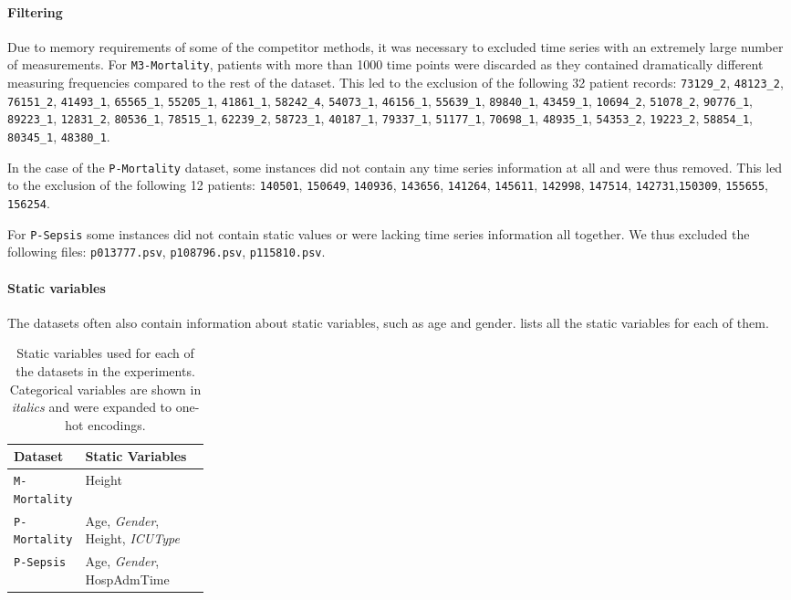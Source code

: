 \documentclass{article}
\newcommand{\dataset}[1]{\texttt{#1}}
\begin{document}
\paragraph{Filtering}
Due to memory requirements of some of the competitor methods, it was necessary
to excluded time series with an extremely large number of measurements. 
For \dataset{M3-Mortality}, patients with more than 1000 time points 
were discarded as they contained dramatically different measuring frequencies 
compared to the rest of the dataset. This led to the exclusion of the
following 32 patient records:
\texttt{73129\_2}, \texttt{48123\_2}, \texttt{76151\_2}, \texttt{41493\_1},
\texttt{65565\_1}, \texttt{55205\_1}, \texttt{41861\_1}, \texttt{58242\_4},
\texttt{54073\_1}, \texttt{46156\_1}, \texttt{55639\_1}, \texttt{89840\_1},
\texttt{43459\_1}, \texttt{10694\_2}, \texttt{51078\_2}, \texttt{90776\_1},
\texttt{89223\_1}, \texttt{12831\_2}, \texttt{80536\_1}, \texttt{78515\_1},
\texttt{62239\_2}, \texttt{58723\_1}, \texttt{40187\_1}, \texttt{79337\_1},
\texttt{51177\_1}, \texttt{70698\_1}, \texttt{48935\_1}, \texttt{54353\_2},
\texttt{19223\_2}, \texttt{58854\_1}, \texttt{80345\_1}, \texttt{48380\_1}.

In the case of the \dataset{P-Mortality} dataset, some instances did not
contain any time series information at all and were thus removed. This led to
the exclusion of the following 12 patients:
\texttt{140501}, \texttt{150649}, \texttt{140936}, \texttt{143656},
\texttt{141264}, \texttt{145611}, \texttt{142998}, \texttt{147514},
\texttt{142731},\texttt{150309}, \texttt{155655}, \texttt{156254}.

For \dataset{P-Sepsis} some instances did not contain static values or were
lacking time series information all together. We thus excluded the following
files: \texttt{p013777.psv}, \texttt{p108796.psv}, \texttt{p115810.psv}.

\paragraph{Static variables}

The datasets often also contain information about static variables, such
as age and gender.  lists all the static
variables for each of them.

\begin{table}
    \caption{Static variables used for each of the datasets in the
    experiments. Categorical variables are shown in \textit{italics} and were
    expanded to one-hot encodings.} \label{tab:static variables}
    \begin{tabularx}{\linewidth}{p{0.25\linewidth}X}
        \toprule
        \textbf{Dataset} & \textbf{Static Variables} \\
        \midrule
        \dataset{M-Mortality} & Height \\
        \dataset{P-Mortality} & Age, \textit{Gender}, Height, \textit{ICUType} \\
        \dataset{P-Sepsis} & Age, \textit{Gender}, HospAdmTime \\
        \bottomrule
    \end{tabularx}
\end{table}
\end{document}
